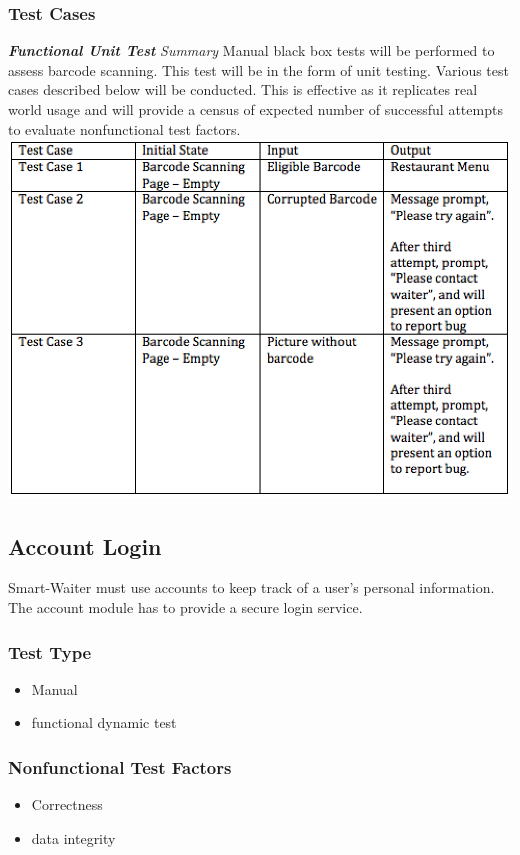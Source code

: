 \documentclass[12pt]{article}
\begin{document}
\subsubsection{Test Cases}
\textbf{\textit{Functional Unit Test}}\newline
\newline
\textit{Summary}\newline
Manual black box tests will be performed to assess barcode scanning. This test will be in the form of unit testing. Various test cases described below will be conducted. This is effective as it replicates real world usage and will provide a census of expected number of successful attempts to evaluate nonfunctional test factors.
\newline
\includegraphics[width=\textwidth,height=\textheight,keepaspectratio]{Barcode.png}\newline

\subsection{Account Login}
Smart-Waiter must use accounts to keep track of a user's personal information. The account module has to provide a secure login service. 
\subsubsection{Test Type}
\begin{itemize}
  \item Manual
  \item functional dynamic test
\end{itemize}
\subsubsection{Nonfunctional Test Factors}
\begin{itemize}
  \item Correctness
  \item data integrity
\end{itemize}
\end{document}

